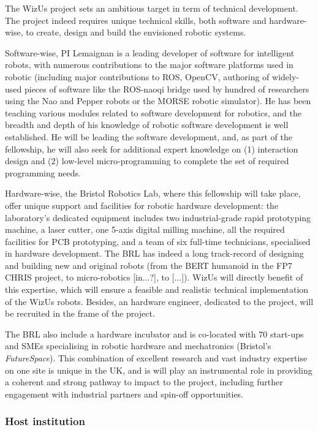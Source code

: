 \documentclass[11pt,a4paper]{report}
\newcommand{\project}{WizUs\xspace}
\begin{document}
The \project project sets an ambitious target in term of technical development.
The project indeed requires unique technical skills, both software and
hardware-wise, to create, design and build the envisioned robotic systems.

Software-wise, PI Lemaignan is a leading
developer of software for intelligent robots, with numerous contributions to
the major software platforms used in robotic (including major contributions to
ROS, OpenCV, authoring of widely-used pieces of software like the ROS-naoqi
bridge used by hundred of researchers using the Nao and Pepper robots or the
MORSE robotic simulator). He has been teaching various modules related to
software development for robotics, and the breadth and depth of his knowledge of
robotic software development is well established. He will be leading the
software development, and, as part of the fellowship, he will also seek for
additional expert knowledge on (1) interaction design and (2) low-level
micro-programming to complete the set of required programming needs.

Hardware-wise, the Bristol Robotics Lab, where this fellowship will take place,
offer unique support and facilities for robotic hardware development: the
laboratory's dedicated equipment includes two industrial-grade rapid prototyping
machine, a laser cutter, one 5-axis digital milling machine, all the required
facilities for PCB prototyping, and a team of six full-time technicians,
specialised in hardware development. The BRL has indeed a long track-record of
designing and building new and original robots (from the BERT humanoid in the
FP7 CHRIS project, to micro-robotics [in...?], to [...]). \project will directly
benefit of this expertise, which will ensure a feasible and realistic technical
implementation of the \project robots. Besides, an hardware engineer, dedicated
to the project, will be recruited in the frame of the project.

The BRL also include a hardware incubator and is co-located with 70 start-ups
and SMEs specialising in robotic hardware and mechatronics (Bristol's
\emph{FutureSpace}). This combination of excellent research and vast industry
expertise on one site is unique in the UK, and is will play an instrumental role
in providing a coherent and strong pathway to impact to the project, including
further engagement with industrial partners and spin-off opportunities.


\hypertarget{host-institution}{%
\subsubsection{Host institution}\label{host-institution}}
\end{document}
